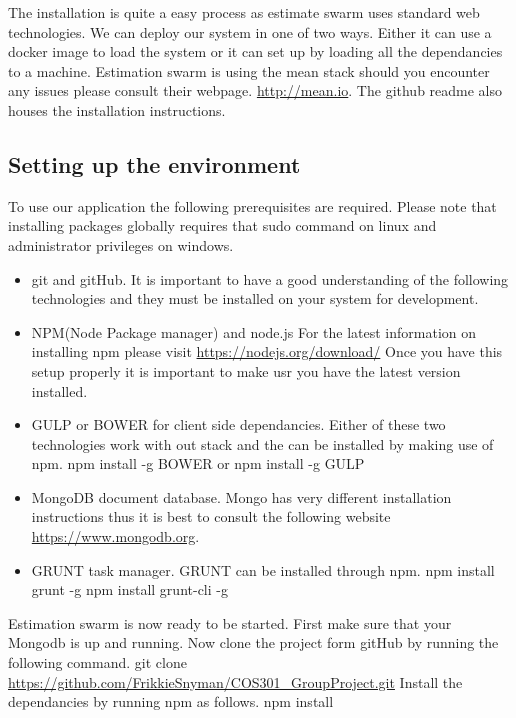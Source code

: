 The installation is quite a easy process as estimate swarm uses standard web technologies. We can deploy our system in one of two ways. Either it can use a docker image to load the system or it can set up by loading all the dependancies to a machine. Estimation swarm is using the mean stack should you encounter any issues please consult their webpage. \url{http://mean.io}. The github readme also houses the installation instructions.
\subsection{Setting up the environment}
To use our application the following prerequisites are required. Please note that installing packages globally requires that sudo command on linux and administrator privileges on windows.
\begin{itemize}
	\item git and gitHub. It is important to have a good understanding of the following technologies and they must be installed on your system for development.
	\item NPM(Node Package manager) and node.js 
	For the latest information on installing npm please visit \url{https://nodejs.org/download/} Once you have this setup properly it is important to make usr you have the latest version installed.
	\item GULP or BOWER for client side dependancies.
	Either of these two technologies work with out stack and the can be installed by making use of npm.
	\newline
	npm install -g BOWER or npm install -g GULP 
	\item MongoDB document database. Mongo has very different installation instructions thus it is best to consult the following website \url{https://www.mongodb.org}.
	\item GRUNT task manager. GRUNT can be installed through npm. 
	\newline
	npm install grunt -g
	\newline
	npm install grunt-cli -g
\end{itemize}
Estimation swarm is now ready to be started. First make sure that your Mongodb is up and running. Now clone the project form gitHub by running the following command.
\newline
git clone \url{https://github.com/FrikkieSnyman/COS301_GroupProject.git}
\newline
Install the dependancies by running npm as follows.
\newline
npm install
